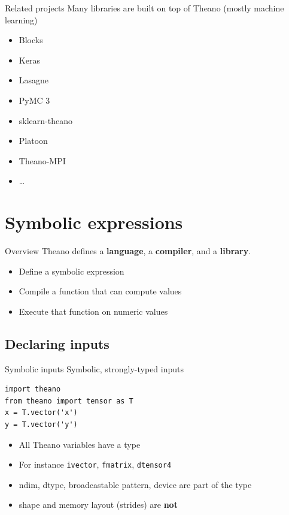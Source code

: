 \documentclass[a4paper,9pt]{beamer}
\begin{document}
\begin{frame}{Related projects}
  Many libraries are built on top of Theano (mostly machine learning)
  \begin{itemize}
  \item Blocks
  \item Keras
  \item Lasagne
  \item PyMC 3
  \item sklearn-theano
  \item Platoon
  \item Theano-MPI
  \item \ldots
  \end{itemize}
\end{frame}


\section{Symbolic expressions}
\begin{frame}
  \tableofcontents[currentsection]
\end{frame}

\begin{frame}{Overview}
  Theano defines a {\bf language}, a {\bf compiler}, and a {\bf library}.
  \begin{itemize}
    \item Define a symbolic expression
    \item Compile a function that can compute values
    \item Execute that function on numeric values
  \end{itemize}
\end{frame}

\subsection{Declaring inputs}
\begin{frame}[fragile]{Symbolic inputs}
  Symbolic, strongly-typed inputs
  \begin{verbatim}
import theano
from theano import tensor as T
x = T.vector('x')
y = T.vector('y')
  \end{verbatim}

  \begin{itemize}
    \item All Theano variables have a type
    \item For instance \verb|ivector|, \verb|fmatrix|, \verb|dtensor4|
    \item ndim, dtype, broadcastable pattern, device are part of the type
    \item shape and memory layout (strides) are {\bf not}
  \end{itemize}
\end{frame}
\end{document}
